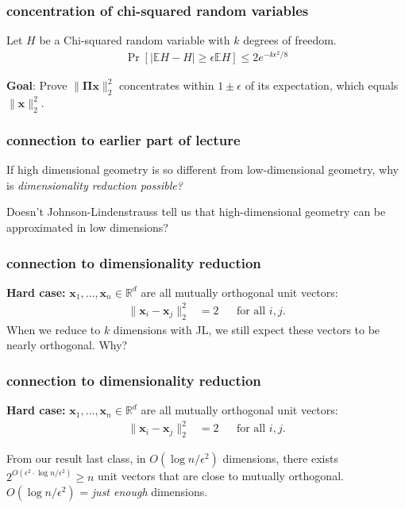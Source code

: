 \documentclass[compress]{beamer}
\newcommand{\bs}[1]{\boldsymbol{#1}}
\newcommand{\bv}[1]{\mathbf{#1}}
\newcommand{\R}{\mathbb{R}}
\newcommand{\E}{\mathbb{E}}
\begin{document}
\begin{frame}[t]
	\frametitle{concentration of chi-squared random variables}
	\begin{lemma} Let $H$ be a Chi-squared random variable with $k$ degrees of freedom. 
		\begin{align*}
			\Pr[|\E H - H| \geq \epsilon \E H] \leq 2 e^{-k\epsilon^2/8}
		\end{align*}
	\end{lemma}
	
	\vspace{8em}
	\begin{block}{\vspace*{-3ex}}
		\small \textbf{Goal}: Prove $\|\bs{\Pi} \bv{x} \|_2^2$ concentrates within $1 \pm \epsilon$ of its expectation, which equals $\|\bv{x} \|_2^2$.
	\end{block}
\end{frame}

\begin{frame}
	\frametitle{connection to earlier part of lecture}
	If high dimensional geometry is so different from low-dimensional geometry, why is \emph{dimensionality reduction possible?} 
	
	Doesn't Johnson-Lindenstrauss tell us that high-dimensional geometry can be approximated in low dimensions?
\end{frame}

\begin{frame}[t]
	\frametitle{connection to dimensionality reduction}
	\textbf{Hard case:} $\bv{x}_1, \ldots, \bv{x}_n \in \R^d$ are all mutually orthogonal unit vectors: 
	\begin{align*}
		\|\bv{x}_i - \bv{x}_j\|_2^2 &= 2 & &\text{for all $i,j$.}  
	\end{align*}
	When we reduce to $k$ dimensions with JL, we still expect these vectors to be nearly orthogonal. Why?
	
\end{frame}

\begin{frame}[t]
	\frametitle{connection to dimensionality reduction}
	\textbf{Hard case:} $\bv{x}_1, \ldots, \bv{x}_n \in \R^d$ are all mutually orthogonal unit vectors: 
	\begin{align*}
		\|\bv{x}_i - \bv{x}_j\|_2^2 &= 2 & &\text{for all $i,j$.}  
	\end{align*}
	
	From our result last class, in $O(\log n /\epsilon^2)$ dimensions, there exists $2^{O(\epsilon^2\cdot \log n /\epsilon^2)} \geq n $ unit vectors that are close to mutually orthogonal.
	\alert{$O(\log n /\epsilon^2)$ = \emph{just enough} dimensions.}
	\vspace{2em}
	
\end{frame}
\end{document}
